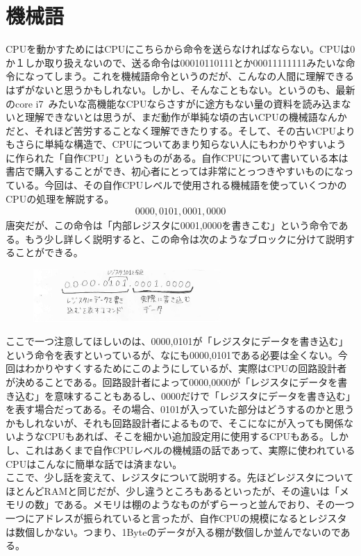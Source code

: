 \section{機械語}
CPUを動かすためにはCPUにこちらから命令を送らなければならない。CPUは0か１しか取り扱えないので、送る命令は00010110111とか00011111111みたいな命令になってしまう。これを機械語命令というのだが、こんなの人間に理解できるはずがないと思うかもしれない。しかし、そんなこともない。というのも、最新のcore i7~みたいな高機能なCPUならさすがに途方もない量の資料を読み込まないと理解できないとは思うが、まだ動作が単純な頃の古いCPUの機械語なんかだと、それほど苦労することなく理解できたりする。そして、その古いCPUよりもさらに単純な構造で、CPUについてあまり知らない人にもわかりやすいように作られた「自作CPU」というものがある。自作CPUについて書いている本は書店で購入することができ、初心者にとっては非常にとっつきやすいものになっている。今回は、その自作CPUレベルで使用される機械語を使っていくつかのCPUの処理を解説する。
\begin{align*}
0000,0101,0001,0000
\end{align*}
唐突だが、この命令は「内部レジスタに0001,0000を書きこむ」という命令である。もう少し詳しく説明すると、この命令は次のようなブロックに分けて説明することができる。
\begin{figure}[H]
  \centering
  \includegraphics[height=2cm]{honda/image/9.jpg}
\end{figure}
ここで一つ注意してほしいのは、0000,0101が「レジスタにデータを書き込む」という命令を表すといっているが、なにも0000,0101である必要は全くない。今回はわかりやすくするためにこのようにしているが、実際はCPUの回路設計者が決めることである。回路設計者によって0000,0000が「レジスタにデータを書き込む」を意味することもあるし、0000だけで「レジスタにデータを書き込む」を表す場合だってある。その場合、0101が入っていた部分はどうするのかと思うかもしれないが、それも回路設計者によるもので、そこになにが入っても関係ないようなCPUもあれば、そこを細かい追加設定用に使用するCPUもある。しかし、これはあくまで自作CPUレベルの機械語の話であって、実際に使われているCPUはこんなに簡単な話では済まない。\\
ここで、少し話を変えて、レジスタについて説明する。先ほどレジスタについてほとんどRAMと同じだが、少し違うところもあるといったが、その違いは「メモリの数」である。メモリは棚のようなものがずらーっと並んでおり、その一つ一つにアドレスが振られていると言ったが、自作CPUの規模になるとレジスタは数個しかない。つまり、1Byteのデータが入る棚が数個しか並んでないのである。\\
